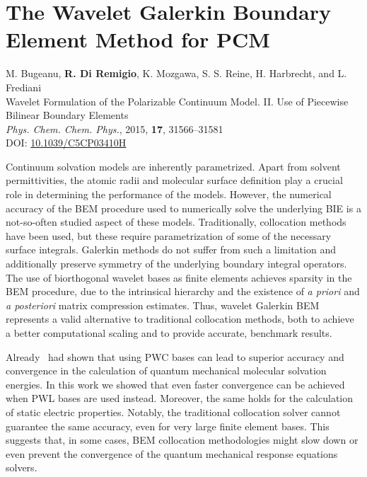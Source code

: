 \section{The Wavelet Galerkin Boundary Element Method for PCM}\label{sec:wemlin}

\begin{tcolorbox}
  {\small
  M. Bugeanu, \textbf{R. Di Remigio}, K. Mozgawa, S. S. Reine, H.
  Harbrecht,  and L. Frediani
  \\
  \textsf{
  Wavelet Formulation of the Polarizable Continuum Model. II. Use of
  Piecewise Bilinear Boundary Elements
  }
  \\
  \textit{Phys. Chem. Chem. Phys.}, \textrm{2015}, \textbf{17},
  31566--31581
  \\
  DOI: \url{10.1039/C5CP03410H}
  }
\end{tcolorbox}

Continuum solvation models are inherently parametrized. Apart from solvent permittivities,
the atomic radii and molecular surface definition play a crucial role
in determining the performance of the models.
However, the numerical accuracy of the \acrshort{BEM} procedure used to numerically solve the
underlying \acrshort{BIE} is a not-so-often studied aspect of these models.
Traditionally, collocation methods have been used, but these require parametrization of some of the necessary surface integrals.
Galerkin methods do not suffer from such a limitation and additionally preserve symmetry of the underlying
boundary integral operators.
The use of biorthogonal wavelet bases as finite elements achieves sparsity in
the \acrshort{BEM} procedure, due to the intrinsical hierarchy and
the existence of \emph{a priori} and \emph{a posteriori} matrix compression
estimates.
Thus, wavelet Galerkin \acrshort{BEM} represents a valid alternative to traditional
collocation methods, both to achieve a better computational scaling and to
provide accurate, benchmark results.\autocite{Harbrecht2004-uo,
Harbrecht2006-ug, Dahmen2006-pj}

Already~\citeauthor{Weijo2010-hy} had shown that using \gls{PWC} bases can lead
to superior accuracy and convergence in the calculation of quantum mechanical
molecular solvation energies.
In this work we showed that even faster convergence can be achieved when
\gls{PWL} bases are used instead.
Moreover, the same holds for the calculation of static electric properties.
Notably, the traditional collocation solver cannot guarantee the same accuracy,
even for very large finite element bases. This suggests that, in some cases,
\acrshort{BEM} collocation methodologies might slow down or even prevent the
convergence of the quantum mechanical response equations solvers.

